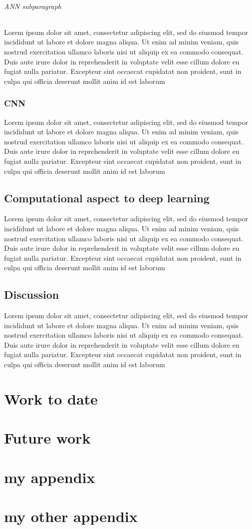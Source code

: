 \documentclass[english,a4paper,11pt,oneside,onecolumn]{book}
\begin{document}
\subparagraph{ANN subparagraph}
Lorem ipsum dolor sit amet, consectetur adipiscing elit, sed do eiusmod tempor incididunt ut labore et dolore magna aliqua. Ut enim ad minim veniam, quis nostrud exercitation ullamco laboris nisi ut aliquip ex ea commodo consequat. Duis aute irure dolor in reprehenderit in voluptate velit esse cillum dolore eu fugiat nulla pariatur. Excepteur sint occaecat cupidatat non proident, sunt in culpa qui officia deserunt mollit anim id est laborum

\subsection{CNN}
Lorem ipsum dolor sit amet, consectetur adipiscing elit, sed do eiusmod tempor incididunt ut labore et dolore magna aliqua. Ut enim ad minim veniam, quis nostrud exercitation ullamco laboris nisi ut aliquip ex ea commodo consequat. Duis aute irure dolor in reprehenderit in voluptate velit esse cillum dolore eu fugiat nulla pariatur. Excepteur sint occaecat cupidatat non proident, sunt in culpa qui officia deserunt mollit anim id est laborum

\section{Computational aspect to deep learning}
Lorem ipsum dolor sit amet, consectetur adipiscing elit, sed do eiusmod tempor incididunt ut labore et dolore magna aliqua. Ut enim ad minim veniam, quis nostrud exercitation ullamco laboris nisi ut aliquip ex ea commodo consequat. Duis aute irure dolor in reprehenderit in voluptate velit esse cillum dolore eu fugiat nulla pariatur. Excepteur sint occaecat cupidatat non proident, sunt in culpa qui officia deserunt mollit anim id est laborum
\section{Discussion}

Lorem ipsum dolor sit amet, consectetur adipiscing elit, sed do eiusmod tempor incididunt ut labore et dolore magna aliqua. Ut enim ad minim veniam, quis nostrud exercitation ullamco laboris nisi ut aliquip ex ea commodo consequat. Duis aute irure dolor in reprehenderit in voluptate velit esse cillum dolore eu fugiat nulla pariatur. Excepteur sint occaecat cupidatat non proident, sunt in culpa qui officia deserunt mollit anim id est laborum
\chapter{Work to date}
\label{sec:wtd}


\chapter{Future work}
\label{sec:fw}


\nocite{}



\appendix
\chapter{my appendix}
\chapter{my other appendix}

\newpage
\end{document}
